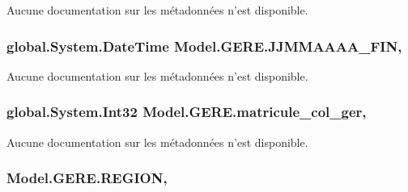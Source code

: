 Aucune documentation sur les métadonnées n'est disponible. 

\hypertarget{class_model_1_1_g_e_r_e_ad81d5bfe8fda3ba990d89ed4f31c282f}{
\subsubsection[{J\-J\-M\-M\-A\-A\-A\-A\-\_\-\-F\-I\-N}]{\setlength{\rightskip}{0pt plus 5cm}global.\-System.\-Date\-Time Model.\-G\-E\-R\-E.\-J\-J\-M\-M\-A\-A\-A\-A\-\_\-\-F\-I\-N\hspace{0.3cm}{\ttfamily [get]}, {\ttfamily [set]}}}\label{class_model_1_1_g_e_r_e_ad81d5bfe8fda3ba990d89ed4f31c282f}


Aucune documentation sur les métadonnées n'est disponible. 

\hypertarget{class_model_1_1_g_e_r_e_a6976ff90929344b89d6329df4f8b7648}{
\subsubsection[{matricule\-\_\-col\-\_\-ger}]{\setlength{\rightskip}{0pt plus 5cm}global.\-System.\-Int32 Model.\-G\-E\-R\-E.\-matricule\-\_\-col\-\_\-ger\hspace{0.3cm}{\ttfamily [get]}, {\ttfamily [set]}}}\label{class_model_1_1_g_e_r_e_a6976ff90929344b89d6329df4f8b7648}


Aucune documentation sur les métadonnées n'est disponible. 

\hypertarget{class_model_1_1_g_e_r_e_a1fa1fc68ea779f030b9a471e22ce290a}{
\subsubsection[{R\-E\-G\-I\-O\-N}]{ Model.\-G\-E\-R\-E.\-R\-E\-G\-I\-O\-N\hspace{0.3cm}{\ttfamily [get]}, {\ttfamily [set]}}}\label{class_model_1_1_g_e_r_e_a1fa1fc68ea779f030b9a471e22ce290a}


